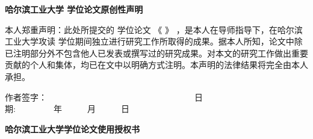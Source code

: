 %
%
%
%
%

\newpage
{}

\vspace{0.5cm}
\newcommand{\subchapterstyle}%
  {\hei\rmfamily\bfseries\fontsize{16bp}{16bp}\selectfont}

{} 
\begin{center}{\subchapterstyle 哈尔滨工业大学 \cxuewei 学位论文原创性声明}\end{center}

    本人郑重声明：此处所提交的 \cxuewei 学位论文 《 \chinesethesistitle 》 ，是本人在导师指导下，在哈尔滨工业大学攻读 \cxuewei 学位期间独立进行研究工作所取得的成果。据本人所知，论文中除已注明部分外不包含他人已发表或撰写过的研究成果。对本文的研究工作做出重要贡献的个人和集体，均已在文中以明确方式注明。本声明的法律结果将完全由本人承担。

\begin{flushright}

作者签字：~~~~~~~~~~~~~~~~~~~~~~~~~~~~~~~~~~~日期:~~~~~~~~~年~~~~~~月~~~~~~日~~~~

\end{flushright}

{} 
\begin{center}{\subchapterstyle 哈尔滨工业大学\cxuewei 学位论文使用授权书}\end{center}

